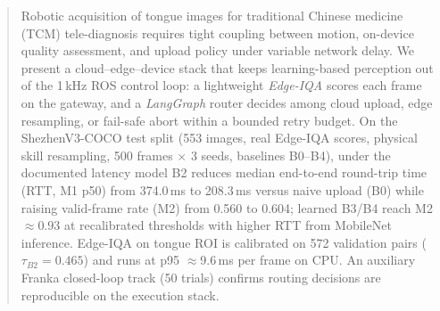 \begin{abstract}
Robotic acquisition of tongue images for traditional Chinese medicine (TCM) tele-diagnosis requires tight coupling between motion, on-device quality assessment, and upload policy under variable network delay.
We present a cloud--edge--device stack that keeps learning-based perception out of the 1\,kHz ROS control loop: a lightweight \emph{Edge-IQA} scores each frame on the gateway, and a \emph{LangGraph} router decides among cloud upload, edge resampling, or fail-safe abort within a bounded retry budget.
On the ShezhenV3-COCO test split (553 images, real Edge-IQA scores, physical skill resampling, 500 frames $\times$ 3 seeds, baselines B0--B4), under the documented latency model B2 reduces median end-to-end round-trip time (RTT, M1 p50) from 374.0\,ms to 208.3\,ms versus naive upload (B0) while raising valid-frame rate (M2) from 0.560 to 0.604; learned B3/B4 reach M2 $\approx 0.93$ at recalibrated thresholds with higher RTT from MobileNet inference.
Edge-IQA on tongue ROI is calibrated on 572 validation pairs ($\tau_{B2}{=}0.465$) and runs at p95 $\approx$9.6\,ms per frame on CPU.
An auxiliary Franka closed-loop track (50 trials) confirms routing decisions are reproducible on the execution stack.
\end{abstract}
